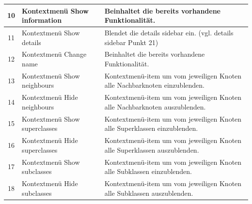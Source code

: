 \documentclass[11pt,a4paper]{article}
\begin{document}
\begin{tabular}{|c|p{5cm}|p{10cm}|}
\hline
10 & Kontextmenü Show information & Beinhaltet die bereits vorhandene Funktionalität. \\
\hline
11 & Kontextmenü Show details & Blendet die details sidebar ein. (vgl. details sidebar Punkt 21) \\
\hline
12 & Kontextmenü Change name & Beinhaltet die bereits vorhandene Funktionalität. \\
\hline
13 & Kontextmenü Show neighbours & Kontextmenü-item um vom jeweiligen Knoten alle Nachbarknoten einzublenden. \\
\hline
14 & Kontextmenü Hide neighbours & Kontextmenü-item um vom jeweiligen Knoten alle Nachbarknoten auszublenden. \\
\hline
15 & Kontextmenü Show superclasses &  Kontextmenü-item um vom jeweiligen Knoten alle Superklassen einzublenden. \\
\hline
16 & Kontextmenü Hide superclasses &  Kontextmenü-item um vom jeweiligen Knoten alle Superklassen auszublenden. \\
\hline
17 & Kontextmenü Show subclasses & Kontextmenü-item um vom jeweiligen Knoten alle Subklassen einzublenden. \\
\hline
18 & Kontextmenü Hide subclasses & Kontextmenü-item um vom jeweiligen Knoten alle Subklassen auszublenden. \\
\hline
\end{tabular}
\vspace*{1cm}
\end{document}
